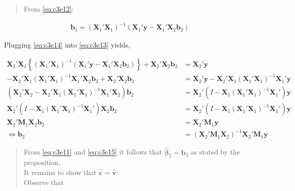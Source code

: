 \documentclass[]{book}
\theoremstyle{definition}
\theoremstyle{definition}
\theoremstyle{definition}
\theoremstyle{remark}
\begin{document}
\begin{quote}
From \eqref{eq:c3e12}:
\end{quote}

\[
\begin{align*}
\mathbf{b}_1 = \left(\mathbf{X}_1'\mathbf{X}_1\right)^{-1}\left(\mathbf{X}_1'\mathbf{y} - \mathbf{X}_1'\mathbf{X}_2\mathbf{b}_2\right)
\label{eq:c3e14}
\end{align*}
\]

Plugging \eqref{eq:c3e14} into \eqref{eq:c3e13} yields,

\[
\begin{align*}
\mathbf{X}_2'\mathbf{X}_1\left\{\left(\mathbf{X}_1'\mathbf{X}_1\right)^{-1}\left(\mathbf{X}_1'\mathbf{y} - \mathbf{X}_1'\mathbf{X}_2\mathbf{b}_2\right)\right\} + \mathbf{X}_2'\mathbf{X}_2\mathbf{b}_2 &=\mathbf{X}_2'\mathbf{y}\nonumber\\
- \mathbf{X}_2'\mathbf{X}_1\left(\mathbf{X}_1'\mathbf{X}_1\right)^{-1}\mathbf{X}_1'\mathbf{X}_2\mathbf{b}_2 + \mathbf{X}_2'\mathbf{X}_2\mathbf{b}_2 &=\mathbf{X}_2'\mathbf{y}- \mathbf{X}_2'\mathbf{X}_1\left(\mathbf{X}_1'\mathbf{X}_1\right)^{-1}\mathbf{X}_1'\mathbf{y}\nonumber\\
\left(\mathbf{X}_2'\mathbf{X}_2 - \mathbf{X}_2'\mathbf{X}_1\left(\mathbf{X}_1'\mathbf{X}_1\right)^{-1}\mathbf{X}_1'\mathbf{X}_2\right)\mathbf{b}_2 &=\mathbf{X}_2'\left(I- \mathbf{X}_1\left(\mathbf{X}_1'\mathbf{X}_1\right)^{-1}\mathbf{X}_1'\right)\mathbf{y}\nonumber\\
\mathbf{X}_2'\left(I - \mathbf{X}_1\left(\mathbf{X}_1'\mathbf{X}_1\right)^{-1}\mathbf{X}_1'\right)\mathbf{X}_2\mathbf{b}_2 &=\mathbf{X}_2'\left(I- \mathbf{X}_1\left(\mathbf{X}_1'\mathbf{X}_1\right)^{-1}\mathbf{X}_1'\right)\mathbf{y}\nonumber\\
\mathbf{X}_2'\mathbf{M}_1\mathbf{X}_2\mathbf{b}_2 &=\mathbf{X}_2'\mathbf{M}_1\mathbf{y}\nonumber\\
\Leftrightarrow \mathbf{b}_2 &=\left(\mathbf{X}_2'\mathbf{M}_1\mathbf{X}_2\right)^{-1}\mathbf{X}_2'\mathbf{M}_1\mathbf{y}
\label{eq:c3e15}
\end{align*}
\]

\begin{quote}
From \eqref{eq:c3e11} and \eqref{eq:c3e15} it follows that \(\hat{\boldsymbol{\beta}}_2=\mathbf{b}_2\) as stated by the proposition.\\
It remains to show that \(\hat{\boldsymbol{\varepsilon}}=\hat{\mathbf{v}}\):\\
Observe that
\end{quote}
\end{document}
